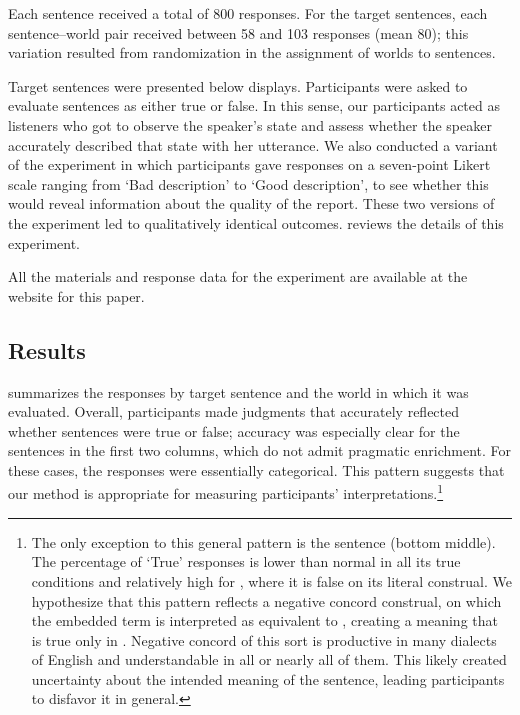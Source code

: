 \documentclass[leqno,12pt]{article}
\begin{document}
Each sentence received a total of 800 responses. For the target
sentences, each sentence--world pair received between 58 and 103
responses (mean 80); this variation resulted from randomization in the
assignment of worlds to sentences.

Target sentences were presented below displays. Participants were
asked to evaluate sentences as either true or false. In this sense,
our participants acted as listeners who got to observe the speaker's
state and assess whether the speaker accurately described that state
with her utterance. We also conducted a variant of the experiment in
which participants gave responses on a seven-point Likert scale
ranging from `Bad description' to `Good description', to see whether
this would reveal information about the quality of the report. These
two versions of the experiment led to qualitatively identical
outcomes.  reviews the details of this
experiment.

All the materials and response data for the experiment are available
at the website for this paper.


\subsection{Results}\label{sec:binary:results}

 summarizes the responses by target
sentence and the world in which it was evaluated. Overall,
participants made judgments that accurately reflected whether
sentences were true or false; accuracy was especially clear for the
sentences in the first two columns, which do not admit pragmatic
enrichment. For these cases, the responses were essentially
categorical. This pattern suggests that our method is appropriate for
measuring participants' interpretations.\footnote{The only exception
  to this general pattern is the sentence  (bottom middle). The percentage of `True' responses is
  lower than normal in all its true conditions and relatively high for
  , where it is false on its literal construal. We
  hypothesize that this pattern reflects a negative concord construal,
  on which the embedded term is interpreted as equivalent to , creating a meaning that is true only in
  . Negative concord of this sort is productive in many
  dialects of English and understandable in all or nearly all of
  them. This likely created uncertainty about the intended meaning of
  the sentence, leading participants to disfavor it in general.}
\end{document}
